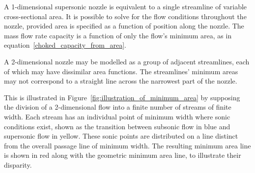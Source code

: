 \documentclass[a4paper, 11pt, oneside]{report}
\begin{document}




A 1-dimensional supersonic nozzle is equivalent to a single streamline of variable cross-sectional area. It is possible to solve for the flow conditions throughout the nozzle, provided area is specified as a function of position along the nozzle. The mass flow rate capacity is a function of only the flow's minimum area, as in equation~\ref{choked_capacity_from_area}.

A 2-dimensional nozzle may be modelled as a group of adjacent streamlines, each of which may have dissimilar area functions. The streamlines' minimum areas may not correspond to a straight line across the narrowest part of the nozzle. 

This is illustrated in Figure~\ref{fig:illustration_of_minimum_area} by supposing the division of a 2-dimensional flow into a finite number of streams of finite width. Each stream has an individual point of minimum width where sonic conditions exist, shown as the transition between subsonic flow in blue and supersonic flow in yellow. These sonic points are distributed on a line distinct from the overall passage line of minimum width. The resulting minimum area line is shown in red along with the geometric minimum area line, to illustrate their disparity.
\end{document}
